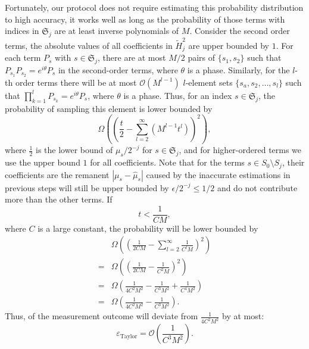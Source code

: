 \documentclass[twocolumn,superscriptaddress,aps,showpacs,amsmath,amstex,amssymb,citeautoscript,floatfix,pra,preprintnumbers]{revtex4-2}
\theoremstyle{plain}
\theoremstyle{plain}
\theoremstyle{plain}
\theoremstyle{plain}
\theoremstyle{plain}
\theoremstyle{plain}
\begin{document}
\begin{appendix}
Fortunately, our protocol does not require estimating this probability distribution to high accuracy, it works well as long as the probability of those terms with indices in $\mathfrak{S}_j$ are at least inverse polynomials of $M$. Consider the second order terms, the absolute values of all coefficients in $\tilde{H}_j^{2}$ are upper bounded by $1$. For each term $P_s$ with $s\in\mathfrak{S}_j$, there are at most $M/2$ pairs of $\{s_1,s_2\}$ such that $P_{s_1}P_{s_2}=e^{i\theta}P_s$ in the second-order terms, where $\theta$ is a phase. Similarly, for the $l$-th order terms there will be at most $\mathcal{O}(M^{l-1})$ $l$-element sets $\{s_a,s_2,\ldots,s_l\}$ such that $\prod_{k=1}^l P_{s_k}=e^{i\theta}P_s$, where $\theta$ is a phase. Thus, for an index $s\in\mathfrak{S}_j$, the probability of sampling this element is lower bounded by
\begin{equation}
    \Omega\left(\left(\frac{t}{2} - \sum_{l=2}^\infty\left(M^{l-1}t^l\right)\right)^2\right),
\end{equation}
where $\frac{1}{2}$ is the lower bound of $\mu_s/2^{-j}$ for $s\in\mathfrak{S}_j$, and for higher-ordered terms we use the upper bound $1$ for all coefficients. 
Note that for the terms $s\in S_0\setminus S_j$, their coefficients are the remanent $|\mu_s-\hat{\mu}_s|$ caused by the inaccurate estimations in previous steps will still be upper bounded by $\epsilon/2^{-{j}}\leq 1/2$ and do not contribute more than the other terms.
If 
\begin{equation}
\label{eq:upper_bound_for_t}
    t < \frac{1}{CM},
\end{equation}
where $C$ is a large constant, the probability will be lower bounded by
\begin{equation}
\begin{split}
    &\Omega\left(\left(\frac{1}{2CM}-\sum_{l=2}^\infty\frac{1}{C^lM}\right)^2\right)\\
    =&\Omega\left(\left(\frac{1}{2CM}-\frac{1}{C^2M}\right)^2\right)\\
    =&\Omega\left(\frac{1}{4C^2M^2}-\frac{1}{C^3M^2} + \frac{1}{C^4M^2}\right)\\
    =&\Omega\left(\frac{1}{4C^2M^2}-\frac{1}{C^3M^2}\right).
\end{split}
\end{equation}
Thus, of the measurement outcome will deviate from $\frac{1}{4C^2M^2}$ by at most:
\begin{equation}
\label{eq:eps_Taylor}
    \varepsilon_{\text{Taylor}} = \mathcal{O}\left(\frac{1}{C^3M^2}\right).
\end{equation}


\end{appendix}
\end{document}
